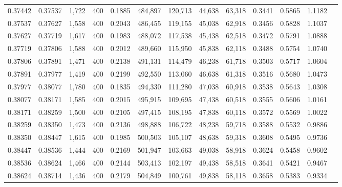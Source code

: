 \begin{tabular}{rrrrrrrrrrrrr}
0.37442 & 0.37537 &  1,722 &   400 &                                     0.1885 & 484,897 & 120,713 &  44,638 &  63,318 & 0.3441 & 0.5865 & 1.1182 \\
0.37537 & 0.37627 &  1,558 &   400 &                                     0.2043 & 486,455 & 119,155 &  45,038 &  62,918 & 0.3456 & 0.5828 & 1.1037 \\
0.37627 & 0.37719 &  1,617 &   400 &                                     0.1983 & 488,072 & 117,538 &  45,438 &  62,518 & 0.3472 & 0.5791 & 1.0888 \\
0.37719 & 0.37806 &  1,588 &   400 &                                     0.2012 & 489,660 & 115,950 &  45,838 &  62,118 & 0.3488 & 0.5754 & 1.0740 \\
0.37806 & 0.37891 &  1,471 &   400 &                                     0.2138 & 491,131 & 114,479 &  46,238 &  61,718 & 0.3503 & 0.5717 & 1.0604 \\
0.37891 & 0.37977 &  1,419 &   400 &                                     0.2199 & 492,550 & 113,060 &  46,638 &  61,318 & 0.3516 & 0.5680 & 1.0473 \\
0.37977 & 0.38077 &  1,780 &   400 &                                     0.1835 & 494,330 & 111,280 &  47,038 &  60,918 & 0.3538 & 0.5643 & 1.0308 \\
0.38077 & 0.38171 &  1,585 &   400 &                                     0.2015 & 495,915 & 109,695 &  47,438 &  60,518 & 0.3555 & 0.5606 & 1.0161 \\
0.38171 & 0.38259 &  1,500 &   400 &                                     0.2105 & 497,415 & 108,195 &  47,838 &  60,118 & 0.3572 & 0.5569 & 1.0022 \\
0.38259 & 0.38350 &  1,473 &   400 &                                     0.2136 & 498,888 & 106,722 &  48,238 &  59,718 & 0.3588 & 0.5532 & 0.9886 \\
0.38350 & 0.38447 &  1,615 &   400 &                                     0.1985 & 500,503 & 105,107 &  48,638 &  59,318 & 0.3608 & 0.5495 & 0.9736 \\
0.38447 & 0.38536 &  1,444 &   400 &                                     0.2169 & 501,947 & 103,663 &  49,038 &  58,918 & 0.3624 & 0.5458 & 0.9602 \\
0.38536 & 0.38624 &  1,466 &   400 &                                     0.2144 & 503,413 & 102,197 &  49,438 &  58,518 & 0.3641 & 0.5421 & 0.9467 \\
0.38624 & 0.38714 &  1,436 &   400 &                                     0.2179 & 504,849 & 100,761 &  49,838 &  58,118 & 0.3658 & 0.5383 & 0.9334 \\

\end{tabular}
